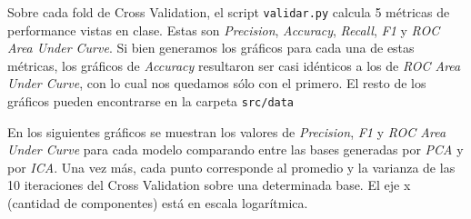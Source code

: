 \documentclass[10pt, a4paper]{article}
\begin{document}
Sobre cada fold de Cross Validation, el script \texttt{validar.py} calcula 5 métricas de performance vistas en clase. Estas son \textit{Precision}, \textit{Accuracy}, \textit{Recall}, \textit{F1} y \textit{ROC Area Under Curve}. Si bien generamos los gráficos para cada una de estas métricas, los gráficos de \textit{Accuracy} resultaron ser casi idénticos a los de \textit{ROC Area Under Curve}, con lo cual nos quedamos sólo con el primero. El resto de los gráficos pueden encontrarse en la carpeta \texttt{src/data}

En los siguientes gráficos se muestran los valores de \textit{Precision}, \textit{F1} y \textit{ROC Area Under Curve} para cada modelo comparando entre las bases generadas por \textit{PCA} y por \textit{ICA}. Una vez más, cada punto corresponde al promedio y la varianza de las 10 iteraciones del Cross Validation sobre una determinada base. El eje x (cantidad de componentes) está en escala logarítmica.
\end{document}
